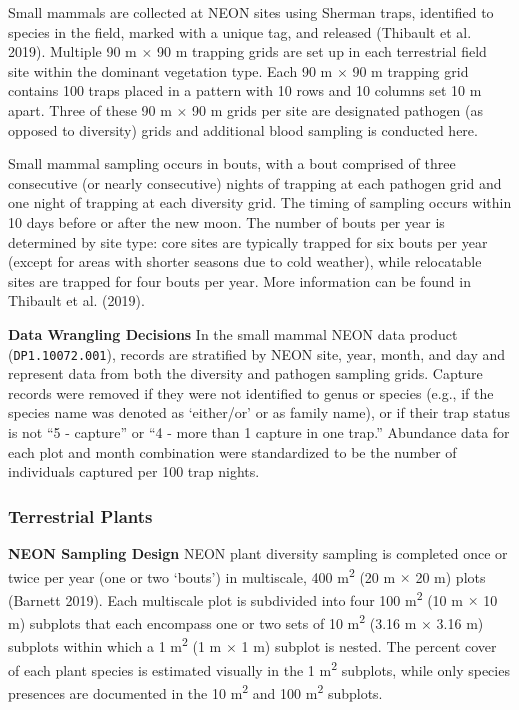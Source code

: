 \documentclass[
  12pt,
]{article}
\begin{document}
Small mammals are collected at NEON sites using Sherman traps, identified to species in the field, marked with a unique tag, and released (Thibault et al. 2019). Multiple 90 m \(\times\) 90 m trapping grids are set up in each terrestrial field site within the dominant vegetation type. Each 90 m \(\times\) 90 m trapping grid contains 100 traps placed in a pattern with 10 rows and 10 columns set 10 m apart. Three of these 90 m \(\times\) 90 m grids per site are designated pathogen (as opposed to diversity) grids and additional blood sampling is conducted here.

Small mammal sampling occurs in bouts, with a bout comprised of three consecutive (or nearly consecutive) nights of trapping at each pathogen grid and one night of trapping at each diversity grid. The timing of sampling occurs within 10 days before or after the new moon. The number of bouts per year is determined by site type: core sites are typically trapped for six bouts per year (except for areas with shorter seasons due to cold weather), while relocatable sites are trapped for four bouts per year. More information can be found in Thibault et al. (2019).

\textbf{Data Wrangling Decisions} In the small mammal NEON data product (\texttt{DP1.10072.001}), records are stratified by NEON site, year, month, and day and represent data from both the diversity and pathogen sampling grids. Capture records were removed if they were not identified to genus or species (e.g., if the species name was denoted as `either/or' or as family name), or if their trap status is not ``5 - capture'' or ``4 - more than 1 capture in one trap.'' Abundance data for each plot and month combination were standardized to be the number of individuals captured per 100 trap nights.

\hypertarget{terrestrial-plants}{%
\subsubsection{Terrestrial Plants}\label{terrestrial-plants}}

\textbf{NEON Sampling Design} NEON plant diversity sampling is completed once or twice per year (one or two `bouts') in multiscale, 400 m\textsuperscript{2} (20 m \(\times\) 20 m) plots (Barnett 2019). Each multiscale plot is subdivided into four 100 m\textsuperscript{2} (10 m \(\times\) 10 m) subplots that each encompass one or two sets of 10 m\textsuperscript{2} (3.16 m \(\times\) 3.16 m) subplots within which a 1 m\textsuperscript{2} (1 m \(\times\) 1 m) subplot is nested. The percent cover of each plant species is estimated visually in the 1 m\textsuperscript{2} subplots, while only species presences are documented in the 10 m\textsuperscript{2} and 100 m\textsuperscript{2} subplots.
\end{document}
